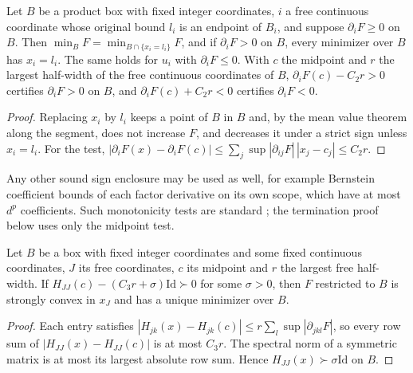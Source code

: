 \begin{lemma}\label{lem:monotone}
Let $B$ be a product box with fixed integer coordinates, $i$ a free
continuous coordinate whose original bound $l_i$ is an endpoint of $B_i$, and
suppose $\partial_iF\ge0$ on $B$. Then $\min_BF=\min_{B\cap\{x_i=l_i\}}F$, and
if $\partial_iF>0$ on $B$, every minimizer over $B$ has $x_i=l_i$. The same
holds for $u_i$ with $\partial_iF\le0$. With $c$ the midpoint and $r$ the
largest half-width of the free continuous coordinates of $B$,
$\partial_iF(c)-C_2r>0$ certifies $\partial_iF>0$ on $B$, and
$\partial_iF(c)+C_2r<0$ certifies $\partial_iF<0$.
\end{lemma}

\begin{proof}
Replacing $x_i$ by $l_i$ keeps a point of $B$ in $B$ and, by the mean value
theorem along the segment, does not increase $F$, and decreases it under a
strict sign unless $x_i=l_i$. For the test,
$|\partial_iF(x)-\partial_iF(c)|\le\sum_j\sup|\partial_{ij}F|\,|x_j-c_j|\le C_2r$.
\end{proof}

Any other sound sign enclosure may be used as well, for example Bernstein
coefficient bounds of each factor derivative on its own scope, which have at
most $d^p$ coefficients. Such monotonicity tests are standard
\cite{ArayaTrombettoniNeveu2010}; the termination proof below uses only the
midpoint test.

\begin{lemma}\label{lem:patch}
Let $B$ be a box with fixed integer coordinates and some fixed continuous
coordinates, $J$ its free coordinates, $c$ its midpoint and $r$ the largest
free half-width. If $H_{JJ}(c)-(C_3r+\sigma)\mathrm{Id}\succ0$ for some
$\sigma>0$, then $F$ restricted to $B$ is strongly convex in $x_J$ and has a
unique minimizer over $B$.
\end{lemma}

\begin{proof}
Each entry satisfies $|H_{jk}(x)-H_{jk}(c)|\le r\sum_l\sup|\partial_{jkl}F|$,
so every row sum of $|H_{JJ}(x)-H_{JJ}(c)|$ is at most $C_3r$. The spectral
norm of a symmetric matrix is at most its largest absolute row sum. Hence
$H_{JJ}(x)\succ\sigma\mathrm{Id}$ on $B$.
\end{proof}

